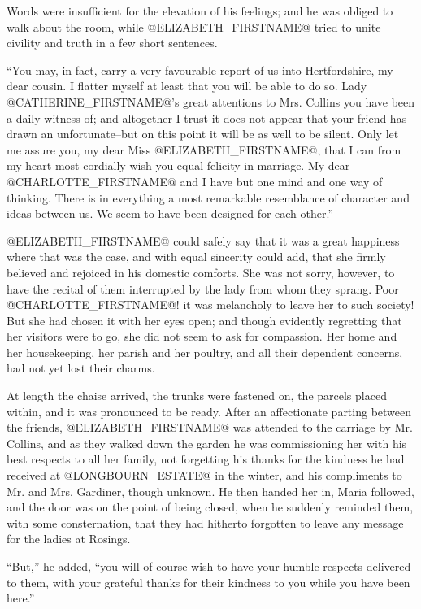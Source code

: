 Words were insufficient for the elevation of his feelings; and he was
obliged to walk about the room, while @ELIZABETH_FIRSTNAME@ tried to unite civility
and truth in a few short sentences.

``You may, in fact, carry a very favourable report of us into
Hertfordshire, my dear cousin. I flatter myself at least that you will
be able to do so. Lady @CATHERINE_FIRSTNAME@'s great attentions to Mrs. Collins you
have been a daily witness of; and altogether I trust it does not appear
that your friend has drawn an unfortunate--but on this point it will be
as well to be silent. Only let me assure you, my dear Miss @ELIZABETH_FIRSTNAME@,
that I can from my heart most cordially wish you equal felicity in
marriage. My dear @CHARLOTTE_FIRSTNAME@ and I have but one mind and one way of
thinking. There is in everything a most remarkable resemblance of
character and ideas between us. We seem to have been designed for each
other.''

@ELIZABETH_FIRSTNAME@ could safely say that it was a great happiness where that was
the case, and with equal sincerity could add, that she firmly believed
and rejoiced in his domestic comforts. She was not sorry, however, to
have the recital of them interrupted by the lady from whom they sprang.
Poor @CHARLOTTE_FIRSTNAME@! it was melancholy to leave her to such society! But she
had chosen it with her eyes open; and though evidently regretting that
her visitors were to go, she did not seem to ask for compassion. Her
home and her housekeeping, her parish and her poultry, and all their
dependent concerns, had not yet lost their charms.

At length the chaise arrived, the trunks were fastened on, the parcels
placed within, and it was pronounced to be ready. After an affectionate
parting between the friends, @ELIZABETH_FIRSTNAME@ was attended to the carriage by
Mr. Collins, and as they walked down the garden he was commissioning her
with his best respects to all her family, not forgetting his thanks
for the kindness he had received at @LONGBOURN_ESTATE@ in the winter, and his
compliments to Mr. and Mrs. Gardiner, though unknown. He then handed her
in, Maria followed, and the door was on the point of being closed,
when he suddenly reminded them, with some consternation, that they had
hitherto forgotten to leave any message for the ladies at Rosings.

``But,'' he added, ``you will of course wish to have your humble respects
delivered to them, with your grateful thanks for their kindness to you
while you have been here.''

